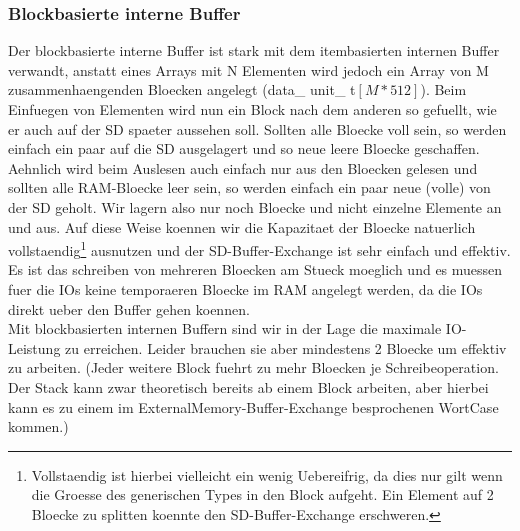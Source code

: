 \documentclass[10pt,a4paper]{article}
\begin{document}
\subsubsection{Blockbasierte interne Buffer}
Der blockbasierte interne Buffer ist stark mit dem itembasierten internen Buffer verwandt, anstatt eines Arrays mit N Elementen wird jedoch ein Array von M zusammenhaengenden Bloecken angelegt (data\_ unit\_ t$[M*512]$). Beim Einfuegen von Elementen wird nun ein Block nach dem anderen so gefuellt, wie er auch auf der SD spaeter aussehen soll. Sollten alle Bloecke voll sein, so werden einfach ein paar auf die SD ausgelagert und so neue leere Bloecke geschaffen.  Aehnlich wird beim Auslesen auch einfach nur aus den Bloecken gelesen und sollten alle RAM-Bloecke leer sein, so werden einfach ein paar neue (volle) von der SD geholt. Wir lagern also nur noch Bloecke und nicht einzelne Elemente an und aus. Auf diese Weise koennen wir die Kapazitaet der Bloecke natuerlich vollstaendig\footnote{Vollstaendig ist hierbei vielleicht ein wenig Uebereifrig, da dies nur gilt wenn die Groesse des generischen Types in den Block aufgeht. Ein Element auf 2 Bloecke zu splitten koennte den SD-Buffer-Exchange erschweren.} ausnutzen und der SD-Buffer-Exchange ist sehr einfach und effektiv. Es ist das schreiben von mehreren Bloecken am Stueck moeglich und es muessen fuer die IOs keine temporaeren Bloecke im RAM angelegt werden, da die IOs direkt ueber den Buffer gehen koennen.\\
Mit blockbasierten internen Buffern sind wir in der Lage die maximale IO-Leistung zu erreichen. Leider brauchen sie aber mindestens 2 Bloecke um effektiv zu arbeiten. (Jeder weitere Block fuehrt zu mehr Bloecken je Schreibeoperation. Der Stack kann zwar theoretisch bereits ab einem Block arbeiten, aber hierbei kann es zu einem im ExternalMemory-Buffer-Exchange besprochenen WortCase kommen.)
\end{document}
